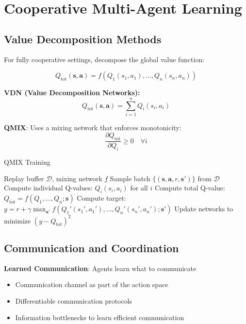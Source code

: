 \section{Cooperative Multi-Agent Learning}

\subsection{Value Decomposition Methods}

For fully cooperative settings, decompose the global value function:

\begin{equation}
Q_{\text{tot}}(\mathbf{s}, \mathbf{a}) = f(Q_1(s_1, a_1), \ldots, Q_n(s_n, a_n))
\end{equation}

\textbf{VDN (Value Decomposition Networks):}
\begin{equation}
Q_{\text{tot}}(\mathbf{s}, \mathbf{a}) = \sum_{i=1}^n Q_i(s_i, a_i)
\end{equation}

\textbf{QMIX}: Uses a mixing network that enforces monotonicity:
\begin{equation}
\frac{\partial Q_{\text{tot}}}{\partial Q_i} \geq 0 \quad \forall i
\end{equation}

\begin{algorithm}
\caption{QMIX Training}
\begin{algorithmic}
\REQUIRE Replay buffer $\mathcal{D}$, mixing network $f$
    \STATE Sample batch $\{(\mathbf{s}, \mathbf{a}, r, \mathbf{s}')\}$ from $\mathcal{D}$
        \STATE Compute individual Q-values: $Q_i(s_i, a_i)$ for all $i$
        \STATE Compute total Q-value: $Q_{\text{tot}} = f(Q_1, \ldots, Q_n; \mathbf{s})$
        \STATE Compute target: $y = r + \gamma \max_{\mathbf{a}'} f(Q_1'(s_1', a_1'), \ldots, Q_n'(s_n', a_n'); \mathbf{s}')$
        \STATE Update networks to minimize $(y - Q_{\text{tot}})^2$
    \ENDFOR
\ENDFOR
\end{algorithmic}
\end{algorithm}

\subsection{Communication and Coordination}

\textbf{Learned Communication}: Agents learn what to communicate
\begin{itemize}
    \item Communication channel as part of the action space
    \item Differentiable communication protocols
    \item Information bottlenecks to learn efficient communication
\end{itemize}

